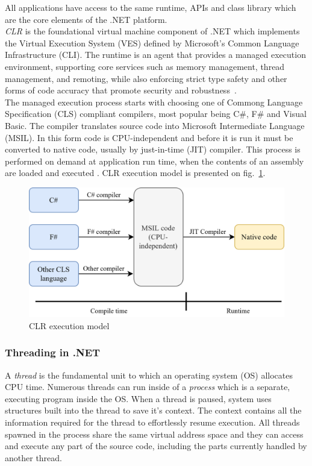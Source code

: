 All applications have access to the same runtime, APIs and class library which are the core elements of the .NET platform.\\

\emph{CLR} is the foundational virtual machine component of .NET which implements the Virtual Execution System (VES) defined by Microsoft's Common Language Infrastructure (CLI). The runtime is an agent that provides a managed execution environment, supporting core services such as memory management, thread management, and remoting, while also enforcing strict type safety and other forms of code accuracy that promote security and robustness~\cite{IntroductionToNet}.\\

The managed execution process starts with choosing one of Commong Language Specification (CLS) compliant compilers, most popular being C\#, F\# and Visual Basic. The compiler translates source code into Microsoft Intermediate Language (MSIL). In this form code is CPU-independent and before it is run it must be converted to native code, usually by just-in-time (JIT) compiler. This process is performed on demand at application run time, when the contents of an assembly are loaded and executed \cite{ManagedExecution}.
CLR execution model is presented on fig.~\ref{fig:clr}.

\begin{figure}[htb]
	\centering
		\includegraphics[scale=1.0]{figures02/clr.png}
	\caption{CLR execution model}
	\label{fig:clr}
\end{figure}


\subsubsection{Threading in .NET}
A \emph{thread} is the fundamental unit to which an operating system (OS) allocates CPU time. Numerous threads can run inside of a \emph{process} which is a separate, executing program inside the OS.
When a thread is paused, system uses structures built into the thread to save it's context. The context contains all the information required for the thread to effortlessly resume execution. All threads spawned in the process share the same virtual address space and they can access and execute any part of the source code, including the parts currently handled by another thread.

